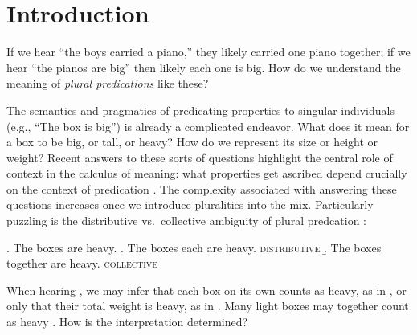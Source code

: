 \documentclass[linguex]{sp}
\begin{document}



\section{Introduction}

If we hear ``the boys carried a piano,'' they likely carried one piano together; if we hear ``the pianos are big'' then likely each one is big. How do we understand the meaning of \emph{plural predications} like these?

The semantics and pragmatics of predicating properties to singular individuals (e.g., ``The box is big'') is already a complicated endeavor. What does it mean for a box to be big, or tall, or heavy? How do we represent its size or height or weight? Recent answers to these sorts of questions highlight the central role of context in the calculus of meaning: what properties get ascribed depend crucially on the context of predication \citep[cf.~tall for a boy vs.~tall for a basketball player;  e.g.,][]{kennedy1999,lassitergoodman2013}. The complexity associated with answering these questions increases once we introduce pluralities into the mix. 
Particularly puzzling is the distributive vs.~collective ambiguity of plural predcation \citep[e.g.,][]{link1983,link1987,link1998,scha1984,landman1989,landman1989b,landman1996,lasersohn1988,lasersohn1990,lasersohn1995,lasersohn1998,schwarzschild1994,schwarzschild1996}:

\ex. \label{boxes} The boxes are heavy.
\a. \label{boxeseach} The boxes each are heavy. \hfill \textsc{distributive}
\b. \label{boxestogether}The boxes together are heavy. \hfill \textsc{collective}

When hearing \Last, we may infer that each box on its own counts as heavy, as in \Last[a], or only that their total weight is heavy, as in \Last[b]. Many light boxes may together count as heavy \citep{scha1984}.
How is the interpretation determined?
\end{document}
